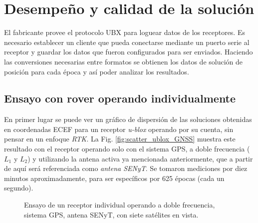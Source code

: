 \documentclass[a4paper,12pt,oneside,onecolumn,final,openright]{book}%
\begin{document}
\section{Desempeño y calidad de la solución}
	El fabricante provee el protocolo UBX para loguear datos de los receptores. Es necesario establecer un cliente que pueda conectarse mediante un puerto serie al receptor y guardar los datos que fueron configurados para ser enviados. Haciendo las conversiones necesarias entre formatos se obtienen los datos de solución de posición para cada época y así poder analizar los resultados.
\subsection{Ensayo con rover operando individualmente} 
	En primer lugar se puede ver un gráfico de dispersión de las soluciones obtenidas en coordenadas ECEF para un receptor \textit{u-blox} operando por su cuenta, sin pensar en un enfoque \textit{RTK}. La Fig. \ref{fig:scatter_ublox_GNSS} muestra este resultado con el receptor operando solo con el sistema GPS, a doble frecuencia ($L_1$ y $L_2$) y utilizando la antena activa ya mencionada anteriormente, que a partir de aquí será referenciada como \textit{antena SENyT}. Se tomaron mediciones por diez minutos aproximadamente, para ser específicos por 625 épocas (cada un segundo).

\begin{figure}
\centering
{}

\centering
{}
\caption{Ensayo de un receptor individual operando a doble frecuencia, sistema GPS, antena SENyT, con siete satélites en vista.}
\label{fig:ensayoGNSS_ublox}
\end{figure}
\end{document}
